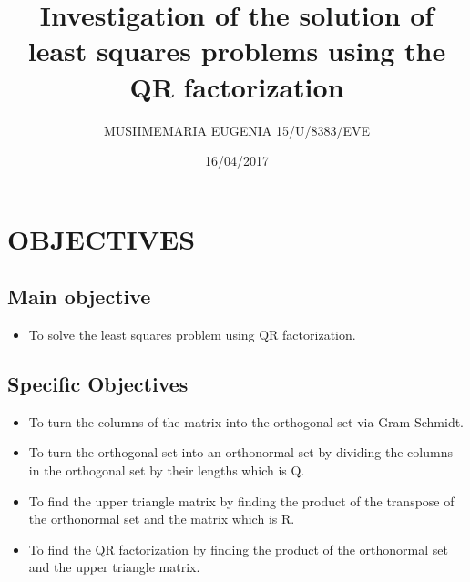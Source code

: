 \documentclass[12pt, letterpaper]{article}
\begin{document}
    \title{Investigation of the solution of least squares problems using the QR factorization}
    \author{MUSIIMEMARIA EUGENIA 15/U/8383/EVE \\}
    \date{16/04/2017}
    \maketitle
\section{OBJECTIVES}
\subsection{Main objective}
\begin{itemize}
    \item To solve the least squares problem using QR factorization.
\end{itemize}

\subsection{Specific Objectives}
\begin{itemize}
    \item To turn the columns of the matrix into the orthogonal set via Gram-Schmidt. \\
    \item To turn the orthogonal set into an orthonormal set by dividing the columns in the orthogonal set by their lengths which is Q.\\
    \item To find the upper triangle matrix by finding the product of the transpose of the orthonormal set and the matrix which is R.\\
    \item To find the QR factorization by finding the product of the orthonormal set and the upper triangle matrix.\\
\end{itemize}
\end{document}
